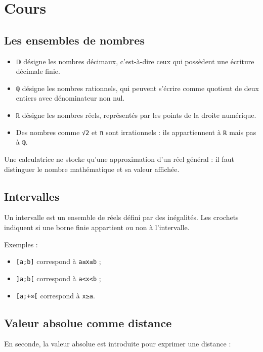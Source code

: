\section{Cours}

\subsection{Les ensembles de nombres}

\begin{itemize}
\item \texttt{𝔻} désigne les nombres décimaux, c'est-à-dire ceux qui possèdent une écriture décimale finie.
\item \texttt{ℚ} désigne les nombres rationnels, qui peuvent s'écrire comme quotient de deux entiers avec dénominateur non nul.
\item \texttt{ℝ} désigne les nombres réels, représentés par les points de la droite numérique.
\item Des nombres comme \texttt{√2} et \texttt{π} sont irrationnels : ils appartiennent à \texttt{ℝ} mais pas à \texttt{ℚ}.
\end{itemize}

Une calculatrice ne stocke qu'une approximation d'un réel général : il faut distinguer le nombre mathématique et sa valeur affichée.

\subsection{Intervalles}

Un intervalle est un ensemble de réels défini par des inégalités. Les crochets indiquent si une borne finie appartient ou non à l'intervalle.

Exemples :

\begin{itemize}
\item \texttt{[a;b]} correspond à \texttt{a≤x≤b} ;
\item \texttt{]a;b[} correspond à \texttt{a<x<b} ;
\item \texttt{[a;+∞[} correspond à \texttt{x≥a}.
\end{itemize}

\subsection{Valeur absolue comme distance}

En seconde, la valeur absolue est introduite pour exprimer une distance :

